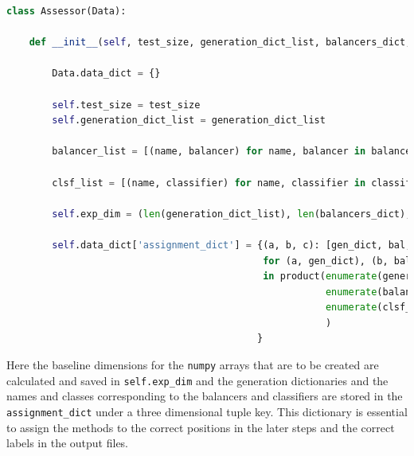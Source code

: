 \begin{lstlisting}[language=Python, numbers=none]
class Assessor(Data):

    def __init__(self, test_size, generation_dict_list, balancers_dict, classifiers_dict):

        Data.data_dict = {}

        self.test_size = test_size
        self.generation_dict_list = generation_dict_list

        balancer_list = [(name, balancer) for name, balancer in balancers_dict.items()]
        
        clsf_list = [(name, classifier) for name, classifier in classifiers_dict.items()]

        self.exp_dim = (len(generation_dict_list), len(balancers_dict), len(classifiers_dict))
        
        self.data_dict['assignment_dict'] = {(a, b, c): [gen_dict, bal, clsf]
                                             for (a, gen_dict), (b, bal), (c, clsf)
                                             in product(enumerate(generation_dict_list), 
                                                        enumerate(balancer_list), 
                                                        enumerate(clsf_list)
                                                        )
                                            }

\end{lstlisting}

Here the baseline dimensions for the \texttt{numpy} arrays that are to be created are calculated and saved in \texttt{self.exp\_dim} and 
the generation dictionaries and the names and classes corresponding to the balancers and classifiers are stored in the \texttt{assignment\_dict} 
under a three dimensional tuple key. 
This dictionary is essential to assign the methods to the correct positions in the later steps and the correct labels in the output files.

